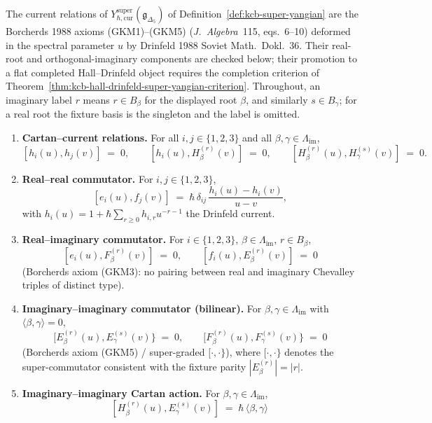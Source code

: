 \begin{theorem}
\label{thm:kcb-super-yangian-serre-BKM}
The current relations of
$Y_{\hbar,\mathrm{cur}}^{\mathrm{super}}(\mathfrak{g}_{\Delta_5})$
of Definition~\ref{def:kcb-super-yangian} are the Borcherds 1988
axioms (\textup{GKM1})--(\textup{GKM5})
(\emph{J.~Algebra}~115, eqs.~6--10) deformed in the spectral
parameter $u$ by Drinfeld 1988 \textup{Soviet Math.~Dokl.}~36. Their
real-root and orthogonal-imaginary components are checked below; their
promotion to a flat completed Hall--Drinfeld object requires the
completion criterion of
Theorem~\ref{thm:kcb-hall-drinfeld-super-yangian-criterion}.
Throughout, an imaginary label $r$ means $r\in B_\beta$ for the displayed
root $\beta$, and similarly $s\in B_\gamma$; for a real root the fixture
basis is the singleton and the label is omitted.
\begin{enumerate}[label=\textup{(Y\arabic*)}, leftmargin=2.4em]
\item \textbf{Cartan--current relations.} For all $i,j\in\{1,2,3\}$ and
 all $\beta,\gamma\in\Lambda_{\mathrm{im}}$,
 \[
 [h_i(u),h_j(v)] \;=\; 0,\qquad
 [h_i(u),H_\beta^{(r)}(v)] \;=\; 0,\qquad
 [H_\beta^{(r)}(u),H_\gamma^{(s)}(v)] \;=\; 0.
 \]
\item \textbf{Real--real commutator.} For $i,j\in\{1,2,3\}$,
 \[
 [e_i(u),f_j(v)] \;=\; \hbar\,\delta_{ij}\,
 \frac{h_i(u)-h_i(v)}{u-v},
 \]
 with $h_i(u)=1+\hbar\sum_{r\geq 0}h_{i,r}u^{-r-1}$ the
 Drinfeld current.
\item \textbf{Real--imaginary commutator.} For $i\in\{1,2,3\}$,
 $\beta\in\Lambda_{\mathrm{im}}$, $r\in B_\beta$,
 \[
 [e_i(u), F_\beta^{(r)}(v)] \;=\; 0,\qquad
 [f_i(u), E_\beta^{(r)}(v)] \;=\; 0
 \]
 (Borcherds axiom \textup{(GKM3)}: no pairing between real and
 imaginary Chevalley triples of distinct type).
\item \textbf{Imaginary--imaginary commutator (bilinear).} For
 $\beta,\gamma\in\Lambda_{\mathrm{im}}$ with
 $\langle\beta,\gamma\rangle=0$,
 \[
 [E_\beta^{(r)}(u),E_\gamma^{(s)}(v)\}
 \;=\; 0,\qquad
 [F_\beta^{(r)}(u),F_\gamma^{(s)}(v)\} \;=\; 0
 \]
 (Borcherds axiom \textup{(GKM5)} / super-graded $[\cdot,\cdot\}$),
 where $[\cdot,\cdot\}$ denotes the super-commutator consistent with
 the fixture parity $|E_\beta^{(r)}|=|r|$.
\item \textbf{Imaginary--imaginary Cartan action.} For
 $\beta,\gamma\in\Lambda_{\mathrm{im}}$,
 \[
 [H_\beta^{(r)}(u),E_\gamma^{(s)}(v)]
 \;=\;
 \hbar\,\langle\beta,\gamma\rangle\,
\]
\end{enumerate}
\end{theorem}
